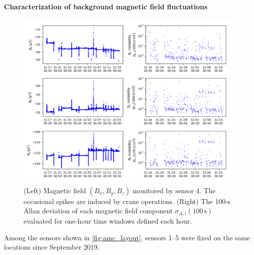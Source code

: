 
\paragraph*{Characterization of background magnetic field fluctuations}
\begin{figure}[tbp]
\centering 
\includegraphics[width=.9\textwidth]{graphics/AMC/stability_overview.png}
\caption{ (Left) Magnetic field $ (B_{x}, B_{y}, B_{z})$ monitored by sensor 4. The occasional spikes are induced by crane operations. (Right)  The 100-s Allan deviation of each magnetic field component $\sigma_{A,i} (100\,\mathrm{s})$ evaluated for one-hour time windows defined each hour.}
\label{fig:amc_stability-overview}
\end{figure}
Among the sensors shown in \ref{fig:amc_layout}, sensors 1--5 were fixed on the same locations since September 2019. 

